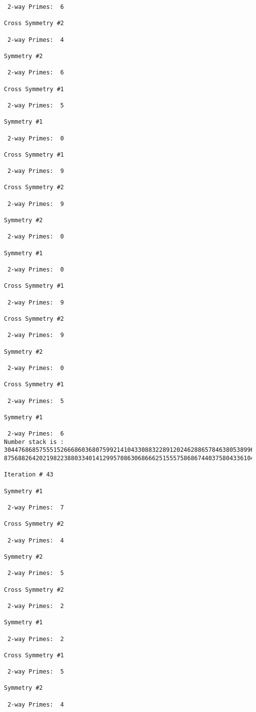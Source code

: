 \begin{verbatim}
 2-way Primes: 	6

Cross Symmetry #2

 2-way Primes: 	4

Symmetry #2

 2-way Primes: 	6

Cross Symmetry #1

 2-way Primes: 	5

Symmetry #1

 2-way Primes: 	0

Cross Symmetry #1

 2-way Primes: 	9

Cross Symmetry #2

 2-way Primes: 	9

Symmetry #2

 2-way Primes: 	0

Symmetry #1

 2-way Primes: 	0

Cross Symmetry #1

 2-way Primes: 	9

Cross Symmetry #2

 2-way Primes: 	9

Symmetry #2

 2-way Primes: 	0

Cross Symmetry #1

 2-way Primes: 	5

Symmetry #1

 2-way Primes: 	6
Number stack is :
30447686857555152666860368075992141043308832289120246288657846380538996794608835958544046240163340857
87568826420219822388033401412995708630686662515557586867440375804336104264044585953880649769983508364

Iteration #	43

Symmetry #1

 2-way Primes: 	7

Cross Symmetry #2

 2-way Primes: 	4

Symmetry #2

 2-way Primes: 	5

Cross Symmetry #2

 2-way Primes: 	2

Symmetry #1

 2-way Primes: 	2

Cross Symmetry #1

 2-way Primes: 	5

Symmetry #2

 2-way Primes: 	4


\end{verbatim}
